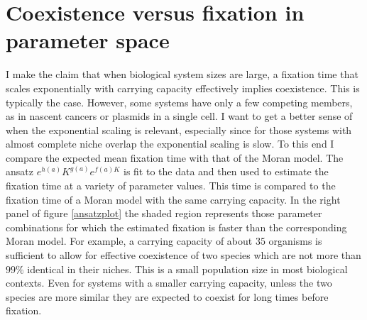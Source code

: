 \section{Coexistence versus fixation in parameter space}

I make the claim that when biological system sizes are large, a fixation time that scales exponentially with carrying capacity effectively implies coexistence. 
This is typically the case. 
However, some systems have only a few competing members, as in nascent cancers or plasmids in a single cell. 
I want to get a better sense of when the exponential scaling is relevant, especially since for those systems with almost complete niche overlap the exponential scaling is slow. 
To this end I compare the expected mean fixation time with that of the Moran model. 
The ansatz $e^{h(a)}K^{g(a)}e^{f(a)K}$ is fit to the data and then used to estimate the fixation time at a variety of parameter values. 
This time is compared to the fixation time of a Moran model with the same carrying capacity. 
In the right panel of figure \ref{ansatzplot} the shaded region represents those parameter combinations for which the estimated fixation is faster than the corresponding Moran model. 
For example, a carrying capacity of about $35$ organisms is sufficient to allow for effective coexistence of two species which are not more than $99\%$ identical in their niches. This is a small population size in most biological contexts. 
Even for systems with a smaller carrying capacity, unless the two species are more similar they are expected to coexist for long times before fixation. 


